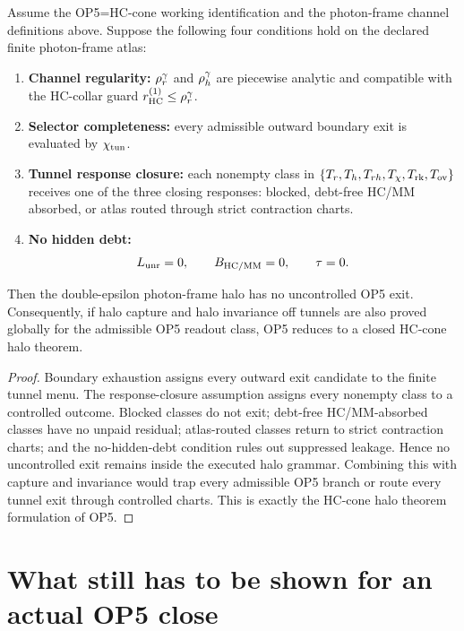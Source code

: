 \begin{theorem}
Assume the OP5=HC-cone working identification and the photon-frame channel definitions above. Suppose the following four conditions hold on the declared finite photon-frame atlas:
\begin{enumerate}
 \item \textbf{Channel regularity:} \(\rho_{r}^{\gamma}\) and \(\rho_{h}^{\gamma}\) are piecewise analytic and compatible with the HC-collar guard \(r_{\mathrm{HC}}^{(1)}\le\rho_{r}^{\gamma}\).
 \item \textbf{Selector completeness:} every admissible outward boundary exit is evaluated by \(\chi_{\mathrm{tun}}\).
 \item \textbf{Tunnel response closure:} each nonempty class in \(\{T_r,T_h,T_{rh},T_{\chi},T_{\mathrm{rk}},T_{\mathrm{ov}}\}\) receives one of the three closing responses: blocked, debt-free HC/MM absorbed, or atlas routed through strict contraction charts.
 \item \textbf{No hidden debt:}
 \[
 L_{\mathrm{unr}}=0,
 \qquad
 B_{\mathrm{HC}/\mathrm{MM}}=0,
 \qquad
 \tau=0.
 \]
\end{enumerate}
Then the double-epsilon photon-frame halo has no uncontrolled OP5 exit. Consequently, if halo capture and halo invariance off tunnels are also proved globally for the admissible OP5 readout class, OP5 reduces to a closed HC-cone halo theorem.
\end{theorem}

\begin{proof}
Boundary exhaustion assigns every outward exit candidate to the finite tunnel menu. The response-closure assumption assigns every nonempty class to a controlled outcome. Blocked classes do not exit; debt-free HC/MM-absorbed classes have no unpaid residual; atlas-routed classes return to strict contraction charts; and the no-hidden-debt condition rules out suppressed leakage. Hence no uncontrolled exit remains inside the executed halo grammar. Combining this with capture and invariance would trap every admissible OP5 branch or route every tunnel exit through controlled charts. This is exactly the HC-cone halo theorem formulation of OP5.
\end{proof}

\section{What still has to be shown for an actual OP5 close}

